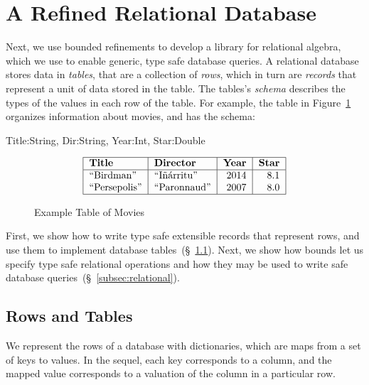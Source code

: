 \section{A Refined Relational Database}\label{sec:database}

Next, we use bounded refinements to develop a library
for relational algebra, which we use to enable generic,
type safe database queries.
%
A relational database stores data in \emph{tables},
that are a collection of \emph{rows}, which in turn 
are \emph{records} that represent a unit of data 
stored in the table.
The tables's \textit{schema} describes the types of 
the values in each row of the table.
For example, the table in Figure~\ref{fig:moviedb} organizes 
information about movies, and has the schema:
%
\begin{code}
 Title:String, Dir:String, Year:Int, Star:Double
\end{code}

\begin{figure}[t]
$$
\begin{tabular}{| l | l| r | r |}
  \hline
  \textbf{Title} & \textbf{Director} & \textbf{Year} & \textbf{Star} \\
  \hline  
  ``Birdman'' & ``I\~{n}\'{a}rritu''   & 2014 & 8.1\\
  ``Persepolis''  & ``Paronnaud'' & 2007 & 8.0 \\ 
  \hline
\end{tabular}
$$
\caption{\label{fig:moviedb} Example Table of Movies}
\end{figure}

First, we show how to write type safe extensible 
records  that represent rows, and use them to 
implement database tables~(\S~\ref{subsec:records}). 
%
Next, we show how bounds let us specify type 
safe relational operations and how they may be 
used to write safe database queries~(\S~\ref{subsec:relational}).

\subsection{Rows and Tables}\label{subsec:records}

We represent the rows of a database with dictionaries, 
which are maps from a set of keys to values.
In the sequel, each key corresponds to a column, and 
the mapped value corresponds to a valuation of the column 
in a particular row.

